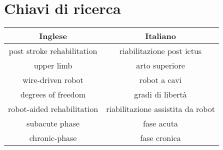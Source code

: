 \section{\label{sec:Chiavi}Chiavi di ricerca}
\begin{table}[h]
	\centering
		\begin{tabular}{c|c}
		\textbf{Inglese} & \textbf{Italiano} \\
			\hline
			post stroke rehabilitation & riabilitazione post ictus \\
			upper limb & arto superiore \\
			wire-driven robot & robot a cavi \\
			degrees of freedom & gradi di libertà \\
			robot-aided rehabilitation & riabilitazione assistita da robot \\
			subacute phase & fase acuta \\
			chronic-phase & fase cronica \\
			\end{tabular}	
	\label{tab:CorrispondenzeItalianoInglese}
\end{table}
 
 
